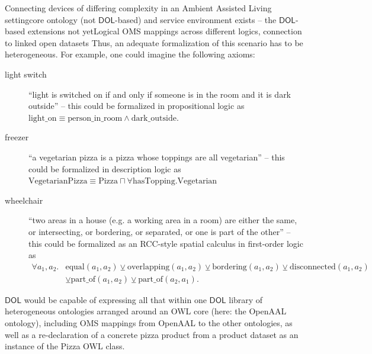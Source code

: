 \documentclass[10pt,fleqn,final]{scrreprt}
\makeatletter
\newcommand*{\eg}{e.g.\@\xspace}
\newcommand*{\DOL}{\ensuremath{\mathsf{DOL}}\xspace}
\makeatother
\begin{document}
\begin{usecase}{Connecting devices of differing complexity in an Ambient Assisted Living setting}{core ontology (not \DOL-based) and service environment exists – the \DOL-based extensions not yet}{Logical OMS mappings across different logics, connection to linked open datasets}
  Thus, an adequate formalization of this scenario has to be heterogeneous.  For example, one could imagine the following axioms:
  \begin{description}
  \item[light switch] ``light is switched on if and only if someone is in the room and it is dark outside'' – this could be formalized in propositional logic as $\mathrm{light\_on}\equiv\mathrm{person\_in\_room}\wedge\mathrm{dark\_outside}$.
  \item[freezer] ``a vegetarian pizza is a pizza whose toppings are all vegetarian'' – this could be formalized in description logic as $\mathrm{VegetarianPizza}\equiv\mathrm{Pizza}\sqcap \forall \mathrm{hasTopping}.\mathrm{Vegetarian}$
  \item[wheelchair] ``two areas in a house (\eg a working area in a room) are either the same, or intersecting, or bordering, or separated, or one is part of the other'' – this could be formalized as an RCC-style spatial calculus in first-order logic as $$\begin{array}{ll}\forall a_1, a_2 . & \mathrm{equal}(a_1, a_2) \veebar \mathrm{overlapping}(a_1, a_2) \veebar \mathrm{bordering}(a_1, a_2) \veebar \mathrm{disconnected}(a_1, a_2) \\
&\veebar \mathrm{part\_of}(a_1, a_2) \veebar \mathrm{part\_of}(a_2, a_1).\end{array}$$
  \end{description}
  
  \DOL would be capable of expressing all that within one \DOL library of heterogeneous ontologies arranged around an OWL core (here: the OpenAAL ontology), including OMS mappings from OpenAAL to the other ontologies, as well as a re-declaration of a concrete pizza product from a product dataset as an instance of the Pizza OWL class.
\end{usecase}
\end{document}
